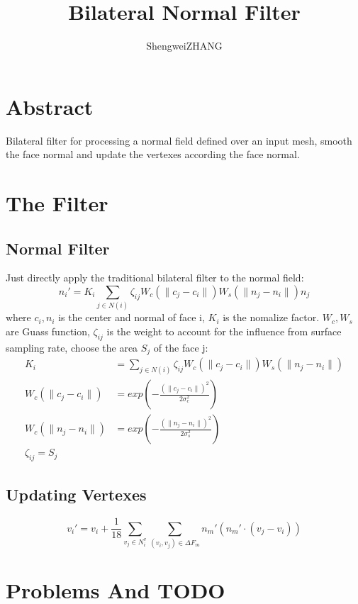 \documentclass{article}
\title{Bilateral Normal Filter}
\author{ShengweiZHANG\\
}
\theoremstyle{definition}
\theoremstyle{remark}
\begin{document}
\maketitle

\section{Abstract}
Bilateral filter for processing a normal field defined over an input mesh, smooth the face normal and update the vertexes according the face normal.
\section{The Filter}
\subsection{Normal Filter}
Just directly apply the traditional bilateral filter to the normal field:
\begin{equation}
  n_i' = K_i \sum_{j\in N(i)} \zeta_{ij} W_c(\parallel c_j-c_i\parallel) W_s(\parallel n_j - n_i \parallel) n_j
\end{equation}
where $c_i, n_i$  is the center and normal of face i, $K_i$ is the nomalize factor. $W_c, W_s$ are Guass function, $\zeta_{ij}$ is the weight to account for the influence from surface sampling rate, choose the area $S_j$ of the face j:
\begin{equation}
  \begin{aligned}
    K_i &= \sum_{j\in N(i)} \zeta_{ij} W_c(\parallel c_j-c_i\parallel) W_s(\parallel n_j - n_i \parallel) \\
    W_c(\parallel c_j-c_i \parallel) &= exp(-\frac{(\parallel c_j-c_i \parallel)^2}{2\sigma_c^2})\\
    W_c(\parallel n_j-n_i \parallel) &= exp(-\frac{(\parallel n_j-n_i \parallel)^2} {2\sigma_s^2})\\
    \zeta_{ij} = S_j
  \end{aligned}
\end{equation}
\subsection{Updating Vertexes}
\begin{equation}
  v_i' = v_i + \frac{1}{18} \sum_{v_j \in N_i^v} \sum_{ (v_i, v_j) \in \Delta F_m} n_m'(n_m' \cdot (v_j - v_i))
\end{equation}
\section{Problems And TODO}
\end{document}

